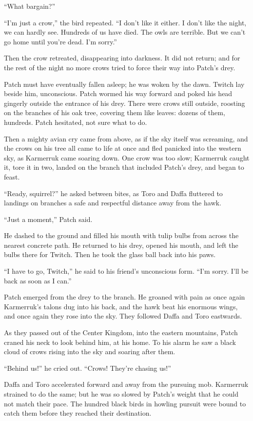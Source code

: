 \documentclass[12pt]{memoir}
\begin{document}
“What bargain?”

“I’m just a crow,” the bird repeated. “I don’t like it either. I don’t
like the night, we can hardly see. Hundreds of us have died. The owls
are terrible. But we can’t go home until you’re dead. I’m sorry.”

Then the crow retreated, disappearing into darkness. It did not
return; and for the rest of the night no more crows tried to force
their way into Patch’s drey.

Patch must have eventually fallen asleep; he was woken by the
dawn. Twitch lay beside him, unconscious. Patch wormed his way forward
and poked his head gingerly outside the entrance of his drey. There
were crows still outside, roosting on the branches of his oak tree,
covering them like leaves: dozens of them, hundreds. Patch hesitated,
not sure what to do.

Then a mighty avian cry came from above, as if the sky itself was
screaming, and the crows on his tree all came to life at once and fled
panicked into the western sky, as Karmerruk came soaring down. One
crow was too slow; Karmerruk caught it, tore it in two, landed on the
branch that included Patch’s drey, and began to feast.

“Ready, squirrel?” he asked between bites, as Toro and Daffa fluttered
to landings on branches a safe and respectful distance away from the
hawk.

“Just a moment,” Patch said.

He dashed to the ground and filled his mouth with tulip bulbs from
across the nearest concrete path. He returned to his drey, opened his
mouth, and left the bulbs there for Twitch. Then he took the glass
ball back into his paws.

“I have to go, Twitch,” he said to his friend’s unconscious form. “I’m
sorry. I’ll be back as soon as I can.”

Patch emerged from the drey to the branch. He groaned with pain as
once again Karmerruk’s talons dug into his back, and the hawk beat his
enormous wings, and once again they rose into the sky. They followed
Daffa and Toro eastwards.

As they passed out of the Center Kingdom, into the eastern mountains,
Patch craned his neck to look behind him, at his home. To his alarm he
saw a black cloud of crows rising into the sky and soaring after them.

“Behind us!” he cried out. “Crows! They’re chasing us!”

Daffa and Toro accelerated forward and away from the pursuing
mob. Karmerruk strained to do the same; but he was so slowed by
Patch’s weight that he could not match their pace. The hundred black
birds in howling pursuit were bound to catch them before they reached
their destination.
\end{document}
